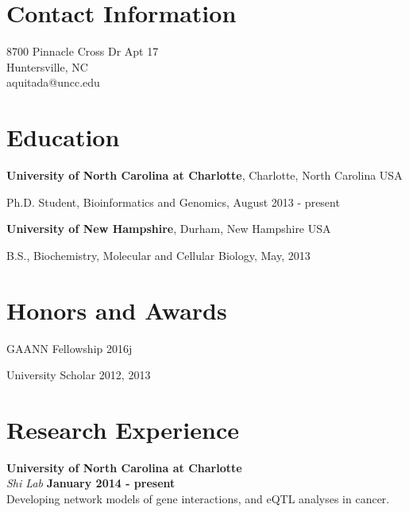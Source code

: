 \documentclass[margin,line]{res}
\newenvironment{list1}{
  \begin{list}{\ding{113}}{%
      \setlength{\itemsep}{0in}
      \setlength{\parsep}{0in} \setlength{\parskip}{0in}
      \setlength{\topsep}{0in} \setlength{\partopsep}{0in} 
      \setlength{\leftmargin}{0.17in}}}{\end{list}}
\begin{document}

\begin{resume}
\section{\sc Contact Information}
\vspace{.05in}
8700 Pinnacle Cross Dr Apt 17  \\                    
Huntersville, NC \\
aquitada@uncc.edu\\       


\section{\sc Education}
{\bf University of North Carolina at Charlotte}, Charlotte, North Carolina USA\\

\vspace*{-.1in}
\begin{list1}
\item[] Ph.D. Student, Bioinformatics and Genomics, August 2013 - present
\end{list1}


{\bf University of New Hampshire}, Durham, New Hampshire USA\\ 
\vspace*{-.1in}
\begin{list1}
\item[] B.S., Biochemistry, Molecular and Cellular Biology,  May, 2013
\end{list1}


\section{\sc Honors and Awards} 

GAANN Fellowship 2016j

University Scholar 2012, 2013


\section{\sc Research Experience}
{\bf University of North Carolina at Charlotte}\\
{\em Shi Lab} \hfill {\bf January 2014 - present}\\
Developing network models of gene interactions, and eQTL analyses in cancer.


\end{resume}
\end{document}
